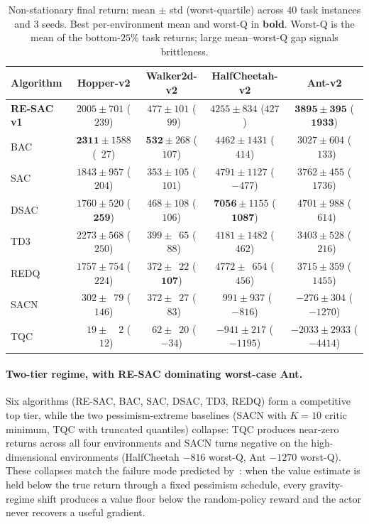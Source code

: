 \documentclass[10pt]{article}
\begin{document}
\begin{table}[!htbp]
\centering
\caption{Non-stationary final return: mean $\pm$ std (worst-quartile) across $40$ task instances and 3 seeds. Best per-environment mean and worst-Q in \textbf{bold}. Worst-Q is the mean of the bottom-$25\%$ task returns; large mean--worst-Q gap signals brittleness.}
\label{tab:nonstationary}
\small
\begin{tabular}{l|cccc}
\toprule
Algorithm & Hopper-v2 & Walker2d-v2 & HalfCheetah-v2 & Ant-v2 \\
\midrule
\textbf{RE-SAC v1} & $2005 \pm 701$ ($239$)        & $477 \pm 101$ ($\phantom{0}99$) & $4255 \pm 834$ ($427$)        & $\mathbf{3895 \pm 395}$ ($\mathbf{1933}$) \\
BAC                & $\mathbf{2311} \pm 1588$ ($\phantom{0}27$) & $\mathbf{532} \pm 268$ ($107$)  & $4462 \pm 1431$ ($414$)       & $3027 \pm 604$ ($\phantom{0}133$) \\
SAC                & $1843 \pm 957$ ($204$)        & $353 \pm 105$ ($101$)         & $4791 \pm 1127$ ($-477$)      & $3762 \pm 455$ ($1736$) \\
DSAC               & $1760 \pm 520$ ($\mathbf{259}$) & $468 \pm 108$ ($106$)         & $\mathbf{7056} \pm 1155$ ($\mathbf{1087}$) & $4701 \pm 988$ ($\phantom{0}614$) \\
TD3                & $2273 \pm 568$ ($250$)        & $399 \pm \phantom{0}65$ ($\phantom{0}88$) & $4181 \pm 1482$ ($462$)       & $3403 \pm 528$ ($\phantom{0}216$) \\
REDQ               & $1757 \pm 754$ ($224$)        & $372 \pm \phantom{0}22$ ($\mathbf{107}$) & $4772 \pm \phantom{0}654$ ($456$) & $3715 \pm 359$ ($1455$) \\
SACN               & $\phantom{0}302 \pm \phantom{0}79$ ($146$) & $372 \pm \phantom{0}27$ ($\phantom{0}83$) & $\phantom{0}991 \pm 937$ ($-816$)  & $-276 \pm 304$ ($-1270$) \\
TQC                & $\phantom{00}19 \pm \phantom{00}2$ ($\phantom{0}12$) & $\phantom{0}62 \pm \phantom{0}20$ ($-34$) & $-941 \pm 217$ ($-1195$)      & $-2033 \pm 2933$ ($-4414$) \\
\bottomrule
\end{tabular}
\end{table}

\paragraph{Two-tier regime, with RE-SAC dominating worst-case Ant.} Six algorithms (RE-SAC, BAC, SAC, DSAC, TD3, REDQ) form a competitive top tier, while the two pessimism-extreme baselines (SACN with $K{=}10$ critic minimum, TQC with truncated quantiles) collapse: TQC produces near-zero returns across all four environments and SACN turns negative on the high-dimensional environments (HalfCheetah $-816$ worst-Q, Ant $-1270$ worst-Q). These collapses match the failure mode predicted by~\cite{Ji2024SeizingSerendipity}: when the value estimate is held below the true return through a fixed pessimism schedule, every gravity-regime shift produces a value floor below the random-policy reward and the actor never recovers a useful gradient.
\end{document}
